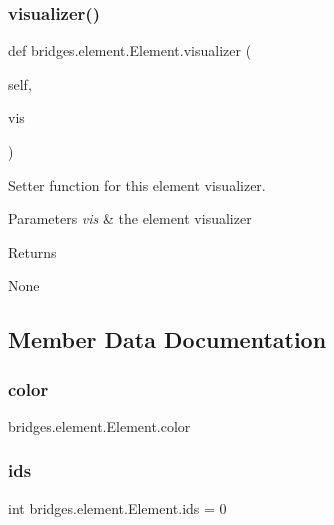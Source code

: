 \subsubsection{\texorpdfstring{visualizer()}{visualizer()}\hspace{0.1cm}{\footnotesize\ttfamily [2/2]}}
{\footnotesize\ttfamily def bridges.\+element.\+Element.\+visualizer (\begin{DoxyParamCaption}\item[{}]{self,  }\item[{}]{vis }\end{DoxyParamCaption})}



Setter function for this element visualizer. 


\begin{DoxyParams}{Parameters}
{\em vis} & the element visualizer \\
\hline
\end{DoxyParams}
\begin{DoxyReturn}{Returns}


None 
\end{DoxyReturn}


\subsection{Member Data Documentation}
\mbox{\label{classbridges_1_1element_1_1_element_a568fd16a353d7852571aa947433095ea}} 
\subsubsection{\texorpdfstring{color}{color}}
{\footnotesize\ttfamily bridges.\+element.\+Element.\+color}

\mbox{\label{classbridges_1_1element_1_1_element_a61f02c915a65554b76dd6534e5a4d834}} 
\subsubsection{\texorpdfstring{ids}{ids}}
{\footnotesize\ttfamily int bridges.\+element.\+Element.\+ids = 0\hspace{0.3cm}{\ttfamily [static]}}

